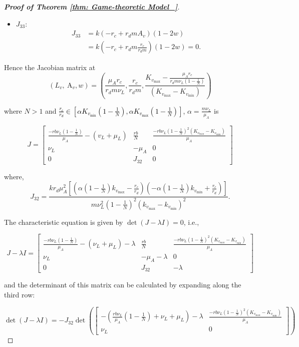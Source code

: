 \documentclass{article}
\theoremstyle{remark}
\theoremstyle{custom} %
\begin{document}
\begin{proof}[\textbf{Proof of Theorem \ref{thm: Game-theoretic Model_}}]
\begin{itemize}
$\text{where}, \quad \frac{m {\nu}_L}{{\mu}_A} = {\alpha}.$

\item $J_{33}:$
$$
\begin{aligned}
J_{33} & =k\left(-r_c+r_d m A_v\right)(1-2 w) \\
& =k\left(-r_c+r_d m \frac{r_c}{r_d m}\right)(1-2 w)=0.
\end{aligned}
$$
\end{itemize}
Hence the Jacobian matrix  at $$
\left(L_v, \mathrm{~A}_v, w\right)=\left(\frac{\mu_A r_c}{r_d  m \nu_L}, \frac{r_c}{r_d m}, \frac{K_{v_{\max }}-\frac{\mu_A r_c}{r_d m \nu_L\left(1-\frac{1}{N}\right)}}{\left(K_{v_{\max }}-K_{v_{\min }}\right)}\right)
$$

where $N>1$ and \textcolor{black}{$\frac{r_c}{r_d} \in\left[\alpha K_{v_{\min }}\left(1-\frac{1}{N}\right), \alpha K_{v_{\max }}\left(1-\frac{1}{N}\right)\right]$}, $\alpha=\frac{m \nu_L}{\mu_A}$ is

$$
J=\left[\begin{array}{ccc}
\frac{-r b \nu_L \left(1-\frac{1}{N}\right)}{\mu_A}-\left(v_L+\mu_L\right) & \frac{r b}{N} & \frac{-r b \nu_L \left(1-\frac{1}{N}\right)^2\left(K_{v_{\max }}-K_{v_{\min }}\right)}{\mu_A} \\
\nu_L & -\mu_A & 0 \\
0 & J_{32} & 0
\end{array}\right]
$$

where, $$
J_{32}=\frac{k r_d \mu_A^2 \left[\left(\alpha \left(1-\frac{1}{N}\right) k_{v_{\max }}-\frac{r_c}{r_d}\right)\left(-\alpha \left(1-\frac{1}{N}\right) k_{v_{\min }}+\frac{r_c}{r_d}\right)\right]}{m \nu_L^2\left(1-\frac{1}{N}\right)^2\left(k_{v_{\max }}-k_{v_{\min }}\right)^2}.
$$

The characteristic equation is given by \(\det(J - \lambda I) = 0\), i.e.,

$$
J-\lambda I=\left[\begin{array}{ccc}
\frac{-r b \nu_L \left(1-\frac{1}{N}\right)}{\mu_A}-\left(\nu_L+\mu_L\right)-\lambda & \frac{r b}{N} & \frac{-r  b \nu_L \left(1-\frac{1}{N}\right)^2\left(K_{v_{\max }}-K_{v_{\min }}\right)}{\mu_A} \\
\nu_L & -\mu_A-\lambda & 0 \\
0 & J_{32} & -\lambda
\end{array}\right]
$$ 

and the determinant of this matrix can be calculated by expanding along the third row:

$$
\operatorname{det}(J-\lambda I)=-J_{32} \operatorname{det}\left(\left[\begin{array}{cc}
-\left(\frac{r b \nu_L}{\mu_A}\left(1-\frac{1}{{N}}\right)+\nu_L+\mu_L\right)-\lambda & \frac{-r  b \nu_L \left(1-\frac{1}{N}\right)^2\left(K_{v_{\max }}-K_{v_{\min }}\right)}{\mu_A} \\
\nu_L & 0
\end{array}\right]\right) 
$$


\end{proof}
\end{document}
